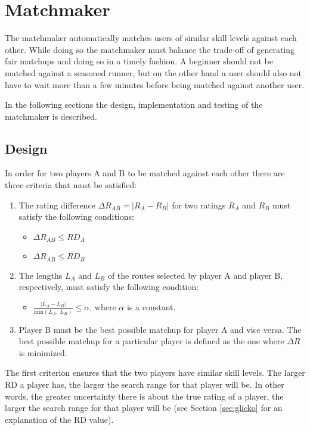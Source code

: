 \section{Matchmaker}
The matchmaker automatically matches users of similar skill levels against each other.
While doing so the matchmaker must balance the trade-off of generating fair matchups and doing so in a timely fashion.
A beginner should not be matched against a seasoned runner, but on the other hand a user should also not have to wait more than a few minutes before being matched against another user.

In the following sections the design, implementation and testing of the matchmaker is described.

\subsection{Design}
In order for two players A and B to be matched against each other there are three criteria that must be satisfied:

\begin{enumerate}
	\item{The rating difference $\Delta R_{AB} = \left|R_A-R_B\right|$ for two ratings $R_A$ and $R_B$ must satisfy the following conditions:}
		\begin{itemize}
			\item{$\Delta R_{AB} \leq RD_A$}
			\item{$\Delta R_{AB} \leq RD_B$}
		\end{itemize}
	\item{The lengths $L_A$ and $L_B$ of the routes selected by player A and player B, respectively, must satisfy the following condition:}
		\begin{itemize}
			\item{$\frac{\left|L_A-L_B\right|}{\mathrm{min}\left(L_A,\:	L_B\right)} \leq \alpha$, where $\alpha$ is a constant.	}
		\end{itemize}
	\item{Player B must be the best possible matchup for player A and vice versa. The best possible matchup for a particular player is defined as the one where $\Delta R$ is minimized.}
\end{enumerate}

The first criterion ensures that the two players have similar skill levels.
The larger RD a player has, the larger the search range for that player will be.
In other words, the greater uncertainty there is about the true rating of a player, the larger the search range for that player will be (see Section \ref{sec:glicko} for an explanation of the RD value).

